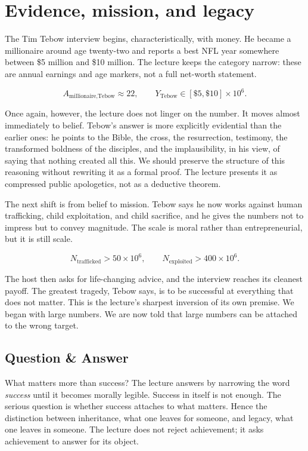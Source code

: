 \section{Evidence, mission, and legacy}

The Tim Tebow interview begins, characteristically, with money. He became a millionaire around age twenty-two and reports a best NFL year somewhere between \$5 million and \$10 million. The lecture keeps the category narrow: these are annual earnings and age markers, not a full net-worth statement.

\begin{equation}
A_{\text{millionaire,Tebow}} \approx 22, \qquad
Y_{\text{Tebow}} \in [\$5,\$10]\times 10^6.
\end{equation}

Once again, however, the lecture does not linger on the number. It moves almost immediately to belief. Tebow's answer is more explicitly evidential than the earlier ones: he points to the Bible, the cross, the resurrection, testimony, the transformed boldness of the disciples, and the implausibility, in his view, of saying that nothing created all this. We should preserve the structure of this reasoning without rewriting it as a formal proof. The lecture presents it as compressed public apologetics, not as a deductive theorem.

The next shift is from belief to mission. Tebow says he now works against human trafficking, child exploitation, and child sacrifice, and he gives the numbers not to impress but to convey magnitude. The scale is moral rather than entrepreneurial, but it is still scale.

\begin{equation}
N_{\text{trafficked}} > 50\times 10^6, \qquad
N_{\text{exploited}} > 400\times 10^6.
\end{equation}

The host then asks for life-changing advice, and the interview reaches its cleanest payoff. The greatest tragedy, Tebow says, is to be successful at everything that does not matter. This is the lecture's sharpest inversion of its own premise. We began with large numbers. We are now told that large numbers can be attached to the wrong target.

\subsection{Question \& Answer}

What matters more than success? The lecture answers by narrowing the word \emph{success} until it becomes morally legible. Success in itself is not enough. The serious question is whether success attaches to what matters. Hence the distinction between inheritance, what one leaves for someone, and legacy, what one leaves in someone. The lecture does not reject achievement; it asks achievement to answer for its object.

